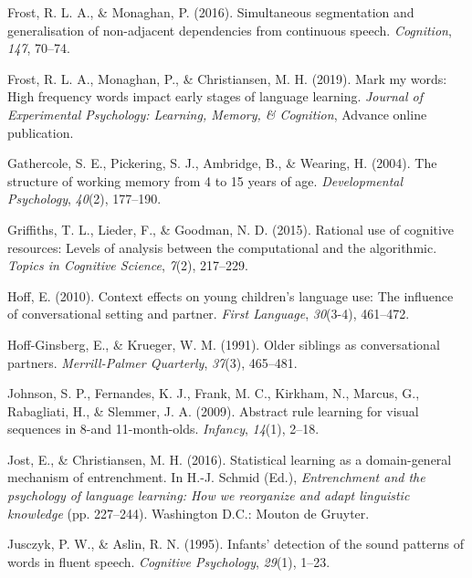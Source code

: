 \documentclass[
  english,
  man,floatsintext]{apa6}
\begin{document}
\leavevmode\hypertarget{ref-frost2016simultaneous}{}%
Frost, R. L. A., \& Monaghan, P. (2016). Simultaneous segmentation and generalisation of non-adjacent dependencies from continuous speech. \emph{Cognition}, \emph{147}, 70--74.

\leavevmode\hypertarget{ref-frost2019}{}%
Frost, R. L. A., Monaghan, P., \& Christiansen, M. H. (2019). Mark my words: High frequency words impact early stages of language learning. \emph{Journal of Experimental Psychology: Learning, Memory, \& Cognition}, Advance online publication.

\leavevmode\hypertarget{ref-gathercole2004structure}{}%
Gathercole, S. E., Pickering, S. J., Ambridge, B., \& Wearing, H. (2004). The structure of working memory from 4 to 15 years of age. \emph{Developmental Psychology}, \emph{40}(2), 177--190.

\leavevmode\hypertarget{ref-griffiths2015rational}{}%
Griffiths, T. L., Lieder, F., \& Goodman, N. D. (2015). Rational use of cognitive resources: Levels of analysis between the computational and the algorithmic. \emph{Topics in Cognitive Science}, \emph{7}(2), 217--229.

\leavevmode\hypertarget{ref-hoff2010context}{}%
Hoff, E. (2010). Context effects on young children's language use: The influence of conversational setting and partner. \emph{First Language}, \emph{30}(3-4), 461--472.

\leavevmode\hypertarget{ref-hoff1991older}{}%
Hoff-Ginsberg, E., \& Krueger, W. M. (1991). Older siblings as conversational partners. \emph{Merrill-Palmer Quarterly}, \emph{37}(3), 465--481.

\leavevmode\hypertarget{ref-johnson2009abstract}{}%
Johnson, S. P., Fernandes, K. J., Frank, M. C., Kirkham, N., Marcus, G., Rabagliati, H., \& Slemmer, J. A. (2009). Abstract rule learning for visual sequences in 8-and 11-month-olds. \emph{Infancy}, \emph{14}(1), 2--18.

\leavevmode\hypertarget{ref-jost201610}{}%
Jost, E., \& Christiansen, M. H. (2016). Statistical learning as a domain-general mechanism of entrenchment. In H.-J. Schmid (Ed.), \emph{Entrenchment and the psychology of language learning: How we reorganize and adapt linguistic knowledge} (pp. 227--244). Washington D.C.: Mouton de Gruyter.

\leavevmode\hypertarget{ref-jusczyk1995infants}{}%
Jusczyk, P. W., \& Aslin, R. N. (1995). Infants' detection of the sound patterns of words in fluent speech. \emph{Cognitive Psychology}, \emph{29}(1), 1--23.
\end{document}
